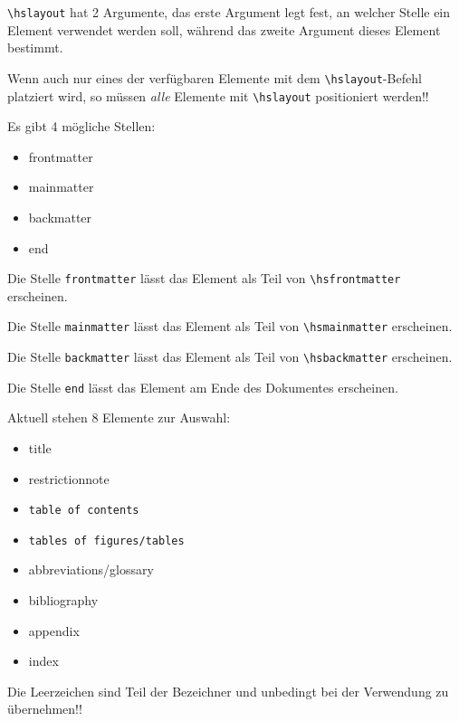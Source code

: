 

\texttt{\textbackslash{}hslayout} hat 2 Argumente, das erste Argument
legt fest, an welcher Stelle ein Element verwendet werden soll, während das
zweite Argument dieses Element bestimmt.

Wenn auch nur eines der verfügbaren Elemente mit dem
\texttt{\textbackslash{}hslayout}-Befehl platziert wird, so müssen
\emph{alle} Elemente mit \texttt{\textbackslash{}hslayout}
positioniert werden!!

Es gibt 4 mögliche Stellen:

\begin{itemize}\ttfamily
	\item frontmatter
	\item mainmatter
	\item backmatter
	\item end
\end{itemize}

Die Stelle \texttt{frontmatter} lässt das Element als Teil von
\texttt{\textbackslash{}hsfrontmatter} erscheinen.

Die Stelle \texttt{mainmatter} lässt das Element als Teil von
\texttt{\textbackslash{}hsmainmatter} erscheinen.

Die Stelle \texttt{backmatter} lässt das Element als Teil von
\texttt{\textbackslash{}hsbackmatter} erscheinen.

Die Stelle \texttt{end} lässt das Element am Ende des Dokumentes
erscheinen.

Aktuell stehen 8 Elemente zur Auswahl:

\begin{itemize}\ttfamily
	\item title
	\item restrictionnote
	\item \verb*!table of contents!
	\item \verb*!tables of figures/tables!
	\item abbreviations/glossary
	\item bibliography
	\item appendix
	\item index
\end{itemize}

Die Leerzeichen sind Teil der Bezeichner und unbedingt bei der
Verwendung zu übernehmen!!

